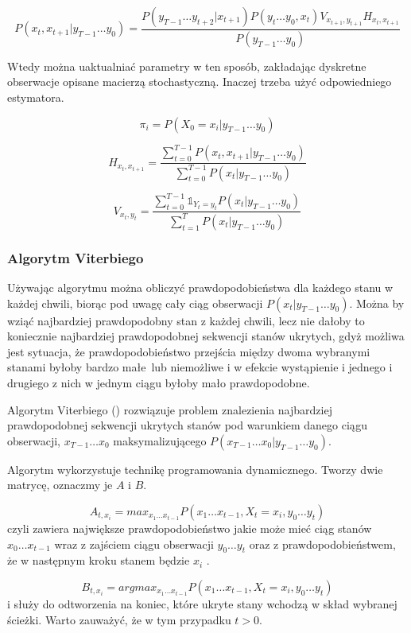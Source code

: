 $$P(x_t, x_{t+1} | y_{T-1} \dots y_0)
= \frac{P(y_{T-1} \dots y_{t+2} | x_{t+1}) P(y_t \dots y_0, x_t) V_{x_{t+1}, y_{t+1}} H_{x_t, x_{t+1}}}{P(y_{T-1} \dots y_0)}$$

Wtedy można uaktualniać parametry w ten sposób, zakładając dyskretne obserwacje opisane macierzą stochastyczną. Inaczej trzeba użyć odpowiedniego estymatora.

$$\pi_i = P(X_0 = x_i | y_{T-1} \dots y_0)$$

$$H_{x_t, x_{t+1}} = \frac{\sum_{t=0}^{T-1} P(x_t, x_{t+1} | y_{T-1} \dots y_0)}{\sum_{t=0}^{T-1} P(x_t | y_{T-1} \dots y_0)}$$

$$V_{x_t, y_t} = \frac{\sum_{t=0}^{T-1} \mathbb{1}_{Y_t = y_t} P(x_t | y_{T-1} \dots y_0)}{\sum_{t=1}^T P(x_t | y_{T-1} \dots y_0)}$$

\subsubsection{Algorytm Viterbiego}

Używając algorytmu  można obliczyć prawdopodobieństwa dla każdego stanu w każdej chwili, biorąc
pod uwagę cały ciąg obserwacji $P(x_t | y_{T-1} \dots y_0)$. Można by wziąć najbardziej prawdopodobny stan z każdej chwili,
lecz nie dałoby to koniecznie najbardziej prawdopodobnej sekwencji stanów ukrytych, gdyż możliwa jest sytuacja, że
prawdopodobieństwo przejścia między dwoma wybranymi stanami byłoby bardzo małe lub niemożliwe i w efekcie wystąpienie 
i jednego i drugiego z nich w jednym ciągu byłoby mało prawdopodobne.

Algorytm Viterbiego () rozwiązuje problem znalezienia najbardziej prawdopodobnej sekwencji ukrytych stanów pod warunkiem danego ciągu obserwacji, $x_{T-1} \dots x_0$ maksymalizującego $P(x_{T-1} \dots x_0 | y_{T-1} \dots y_0)$. 

Algorytm wykorzystuje technikę programowania dynamicznego. Tworzy dwie matrycę, oznaczmy je $A$ i $B$.

$$A_{t,x_i} = max_{x_1 \dots x_{t-1}} P(x_1 \dots x_{t-1}, X_t = x_i, y_0 \dots y_t)$$ 
czyli zawiera największe prawdopodobieństwo jakie może mieć ciąg stanów $x_0 \dots x_{t-1}$ wraz z zajściem ciągu obserwacji $y_0 \dots y_t$ oraz z prawdopodobieństwem, że w następnym kroku stanem będzie $x_i$ .

$$B_{t,x_i} = argmax_{x_1 \dots x_{t-1}} P(x_1 \dots x_{t-1}, X_t = x_i, y_0 \dots y_t)$$ i służy do odtworzenia na koniec, które ukryte stany wchodzą w skład wybranej ścieżki. Warto zauważyć, że w tym przypadku $t > 0$.

